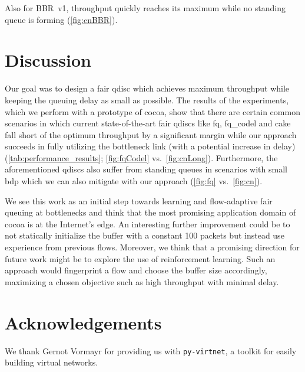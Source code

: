 \documentclass[sigconf, 10pt, letterpaper,dvipsnames\ifx\removeHeaders\tempYes ,nonacm\fi]{acmart}
\begin{document}
Also for BBR~v1, throughput quickly reaches its maximum while no standing queue is forming (\autoref{fig:cnBBR}). 

\section{Discussion}

Our goal was to design a fair \gls{qdisc} which achieves maximum throughput while keeping the queuing delay as small as possible. The results of the experiments, which we perform with a prototype of \gls{cocoa}, show that there are certain common scenarios in which current state-of-the-art fair \glspl{qdisc} like fq, fq\_codel and cake fall short of the optimum throughput by a significant margin while our approach succeeds in fully utilizing the bottleneck link (with a potential increase in delay) (\autoref{tab:performance_results}; \autoref{fig:fqCodel} vs.~\autoref{fig:cnLong}). Furthermore, the aforementioned \glspl{qdisc} also suffer from standing queues in scenarios with small \gls{bdp} which we can also mitigate with our approach (\autoref{fig:fq} vs.~\autoref{fig:cn}). 

We see this work as an initial step towards learning and flow-adaptive fair queuing at bottlenecks and think that the most promising application domain of \gls{cocoa} is at the Internet's edge. An interesting further improvement could be to not statically initialize the buffer with a constant 100 packets but instead use experience from previous flows. Moreover, we think that a promising direction for future work might be to explore the use of reinforcement learning. Such an approach would fingerprint a flow and choose the buffer size accordingly, maximizing a chosen objective such as high throughput with minimal delay. 

\section*{Acknowledgements}
We thank Gernot Vormayr for providing us with \texttt{py-virtnet}, a toolkit for easily building virtual networks. 



\end{document}
